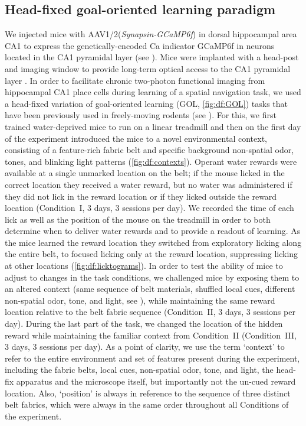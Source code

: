 \subsection{Head-fixed goal-oriented learning paradigm}
We injected mice with AAV1/2(\emph{Synapsin-GCaMP6f}) in dorsal hippocampal area CA1 to express the genetically-encoded Ca indicator GCaMP6f \citep{Chen2013} in neurons located in the CA1 pyramidal layer (see ).  Mice were implanted with a head-post and imaging window to provide long-term optical access to the CA1 pyramidal layer \citep{Danielson2016b, Kaifosh2013, Lovett-Barron2014}.  In order to facilitate chronic two-photon functional imaging from hippocampal CA1 place cells \citep{Danielson2016b, Dombeck2010} during learning of a spatial navigation task, we used a head-fixed variation of goal-oriented learning \citep{Danielson2016b} (GOL, \autoref{fig:df:GOL}) tasks that have been previously used in freely-moving rodents \citep{Dupret2010a} (see ).  For this, we first trained water-deprived mice to run on a linear treadmill \citep{Danielson2016a, Danielson2016b, Royer2012} and then on the first day of the experiment introduced the mice to a novel environmental context, consisting of a feature-rich fabric belt and specific background non-spatial odor, tones, and blinking light patterns (\autoref{fig:df:contexts}). Operant water rewards were available at a single unmarked location on the belt; if the mouse licked in the correct location they received a water reward, but no water was administered if they did not lick in the reward location or if they licked outside the reward location (Condition~I, 3 days, 3 sessions per day).  We recorded the time of each lick as well as the position of the mouse on the treadmill in order to both determine when to deliver water rewards and to provide a readout of learning. As the mice learned the reward location they switched from exploratory licking along the entire belt, to focused licking only at the reward location, suppressing licking at other locations (\autoref{fig:df:licktograms}). In order to test the ability of mice to adjust to changes in the task conditions, we challenged mice by exposing them to an altered context (same sequence of belt materials, shuffled local cues, different non-spatial odor, tone, and light, see ), while maintaining the same reward location relative to the belt fabric sequence (Condition~II, 3 days, 3 sessions per day). During the last part of the task, we changed the location of the hidden reward while maintaining the familiar context from Condition~II (Condition~III, 3 days, 3 sessions per day). As a point of clarity, we use the term `context' to refer to the entire environment and set of features present during the experiment, including the fabric belts, local cues, non-spatial odor, tone, and light, the head-fix apparatus and the microscope itself, but importantly not the un-cued reward location. Also, `position' is always in reference to the sequence of three distinct belt fabrics, which were always in the same order throughout all Conditions of the experiment.
